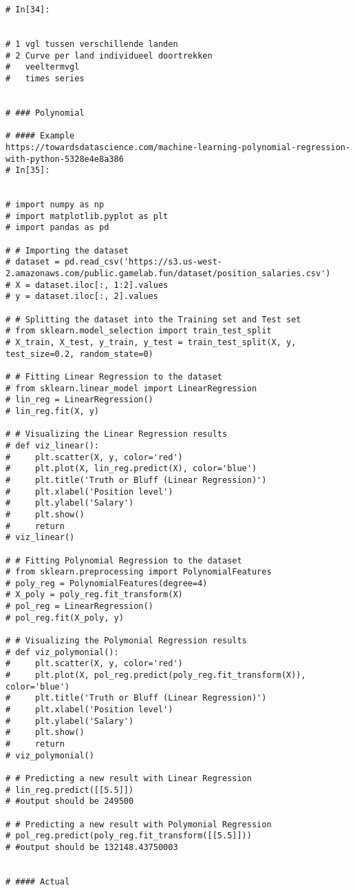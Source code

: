 \begin{lstlisting}
# In[34]:


# 1 vgl tussen verschillende landen
# 2 Curve per land individueel doortrekken
#   veeltermvgl
#   times series


# ### Polynomial

# #### Example
https://towardsdatascience.com/machine-learning-polynomial-regression-with-python-5328e4e8a386
# In[35]:


# import numpy as np
# import matplotlib.pyplot as plt
# import pandas as pd

# # Importing the dataset
# dataset = pd.read_csv('https://s3.us-west-2.amazonaws.com/public.gamelab.fun/dataset/position_salaries.csv')
# X = dataset.iloc[:, 1:2].values
# y = dataset.iloc[:, 2].values

# # Splitting the dataset into the Training set and Test set
# from sklearn.model_selection import train_test_split 
# X_train, X_test, y_train, y_test = train_test_split(X, y, test_size=0.2, random_state=0)

# # Fitting Linear Regression to the dataset
# from sklearn.linear_model import LinearRegression
# lin_reg = LinearRegression()
# lin_reg.fit(X, y)

# # Visualizing the Linear Regression results
# def viz_linear():
#     plt.scatter(X, y, color='red')
#     plt.plot(X, lin_reg.predict(X), color='blue')
#     plt.title('Truth or Bluff (Linear Regression)')
#     plt.xlabel('Position level')
#     plt.ylabel('Salary')
#     plt.show()
#     return
# viz_linear()

# # Fitting Polynomial Regression to the dataset
# from sklearn.preprocessing import PolynomialFeatures
# poly_reg = PolynomialFeatures(degree=4)
# X_poly = poly_reg.fit_transform(X)
# pol_reg = LinearRegression()
# pol_reg.fit(X_poly, y)

# # Visualizing the Polymonial Regression results
# def viz_polymonial():
#     plt.scatter(X, y, color='red')
#     plt.plot(X, pol_reg.predict(poly_reg.fit_transform(X)), color='blue')
#     plt.title('Truth or Bluff (Linear Regression)')
#     plt.xlabel('Position level')
#     plt.ylabel('Salary')
#     plt.show()
#     return
# viz_polymonial()

# # Predicting a new result with Linear Regression
# lin_reg.predict([[5.5]])
# #output should be 249500

# # Predicting a new result with Polymonial Regression
# pol_reg.predict(poly_reg.fit_transform([[5.5]]))
# #output should be 132148.43750003


# #### Actual


\end{lstlisting}
